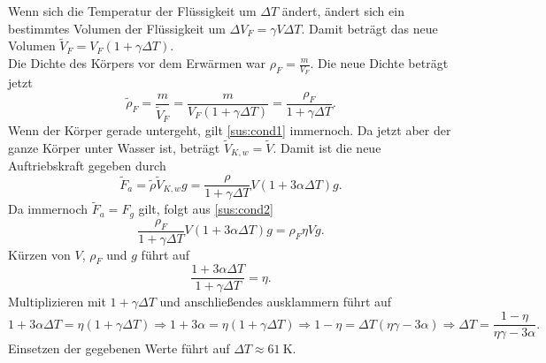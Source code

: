 \begin{Answer}[ref=sus]
		Wenn sich die Temperatur der Flüssigkeit um $\Delta T$ ändert, ändert sich ein bestimmtes Volumen der Flüssigkeit um $\Delta V_F = \gamma V \Delta T  $. Damit beträgt das neue Volumen $\tilde{V}_F  = V_F \left(1+\gamma \Delta T\right)$. \\
		Die Dichte des Körpers vor dem Erwärmen war $\rho_F = \frac{m}{V_F}$. Die neue Dichte beträgt jetzt 
		\begin{equation}\label{sus:newdens}
		\tilde{\rho}_F = \frac{m}{\tilde{V}_F} = \frac{m}{V_F\left(1+\gamma \Delta T\right)} = \frac{\rho_F}{1+\gamma \Delta T}.
		\end{equation}
		Wenn der Körper gerade untergeht, gilt \eqref{sus:cond1} immernoch. Da jetzt aber der ganze Körper unter Wasser ist, beträgt $\tilde{V}_{K,w} = \tilde{V}$. Damit ist die neue Auftriebskraft gegeben durch
		\begin{equation}
		\tilde{F}_a = \tilde{\rho} \tilde{V}_{K,w}g = \frac{\rho}{1+\gamma \Delta T} V\left(1+3\alpha\Delta T\right)g.
		\end{equation}
		Da immernoch $\tilde{F}_a = F_g$ gilt, folgt aus \eqref{sus:cond2}
		\begin{equation}
		\frac{\rho_F}{1+\gamma \Delta T} V\left(1+3\alpha\Delta T\right) g= \rho_{F}\eta V g.
		\end{equation}	
		Kürzen von $V$, $\rho_F$ und $g$ führt auf
		\begin{equation*}
		\frac{1+3\alpha \Delta T}{1+\gamma \Delta T} = \eta.
		\end{equation*}	
		Multiplizieren mit $1+\gamma \Delta T$ und anschließendes ausklammern führt auf
		\begin{equation*}
		1 + 3\alpha \Delta T = \eta\left(1+\gamma \Delta T\right) \Rightarrow 1+3\alpha = \eta \left(1+\gamma \Delta T\right) \Rightarrow 1-\eta = \Delta T \left(\eta \gamma - 3\alpha\right) \Rightarrow \Delta T = \frac{1-\eta}{\eta \gamma - 3\alpha }.
		\end{equation*}
		Einsetzen der gegebenen Werte führt auf $\Delta T \approx 61~\mathrm{K}$.
\end{Answer}